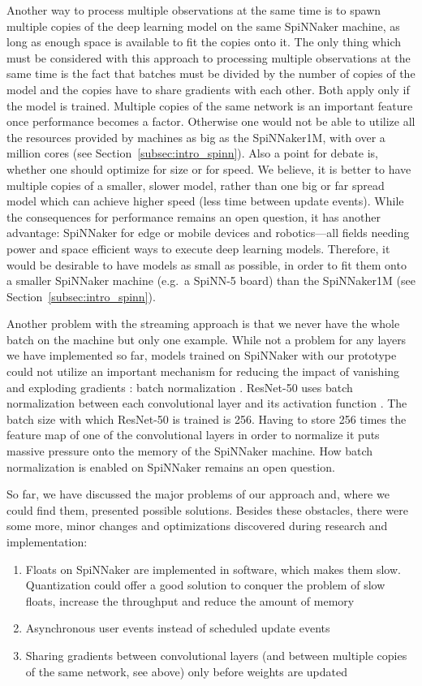\documentclass[]{article}
\begin{document}
Another way to process multiple observations at the same time is
to spawn multiple copies of the deep learning model on the same
SpiNNaker machine, as long as enough space is available to fit the
copies onto it.
The only thing which must be considered with this approach to
processing multiple observations at the same time is the
fact that batches must be divided by the number of copies of the model
and the copies have to share gradients with each other.
Both apply only if the model is trained.
Multiple copies of the same network is an important feature once
performance becomes a factor.
Otherwise one would not be able to utilize all the resources provided
by machines as big as the SpiNNaker1M, with over a million cores (see
Section~\ref{subsec:intro_spinn}).
Also a point for debate is, whether one should optimize for size or
for speed.
We believe, it is better to have multiple copies of a smaller, slower
model, rather than one big or far spread model which can achieve
higher speed (less time between update events).
While the consequences for performance remains an open question,
it has another advantage: SpiNNaker for edge or mobile devices and
robotics---all fields needing power and space efficient ways to
execute deep learning models.
Therefore, it would be desirable to have models as small as possible,
in order to fit them onto a smaller SpiNNaker machine (e.g.\ a
SpiNN-5 board) than the SpiNNaker1M
(see Section~\ref{subsec:intro_spinn}).

Another problem with the streaming approach is that we never have the
whole batch on the machine but only one example.
While not a problem for any layers we have implemented so far,
models trained on SpiNNaker with our prototype could not utilize an
important mechanism for reducing the impact of vanishing and exploding
gradients \citep{bengio_et_al_1994, glorot_et_al_2010,
  brownlee_2019a}: batch normalization \citep{ioffe_et_al_2015}.
ResNet-50 uses batch normalization between each convolutional layer
and its activation function \citep{he_et_al_2015}.
The batch size with which ResNet-50 is trained is 256.
Having to store 256 times the feature map of one of the convolutional
layers in order to normalize it puts massive pressure onto the memory
of the SpiNNaker machine.
How batch normalization is enabled on SpiNNaker remains an open
question.

So far, we have discussed the major problems of our approach and,
where we could find them, presented possible solutions.
Besides these obstacles, there were some more, minor changes and
optimizations discovered during research and implementation:
\begin{enumerate}
  \item Floats on SpiNNaker are implemented in software, which makes
    them slow. Quantization \citep{praveen_2020} could offer a good
    solution to conquer the problem of slow floats, increase the
    throughput and reduce the amount of memory
  \item Asynchronous user events instead of scheduled update events
  \item Sharing gradients between convolutional layers (and between
    multiple copies of the same network, see above) only before
    weights are updated
\end{enumerate}
\end{document}
